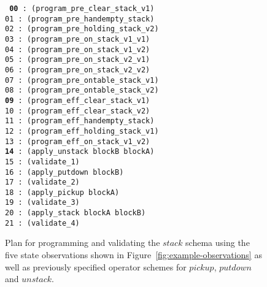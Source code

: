 \documentclass[3p,times]{elsarticle}
\begin{document}
\begin{figure}[hbt!]
{\footnotesize\tt
     {\bf 00} : (program\_pre\_clear\_stack\_v1)\\
     01 : (program\_pre\_handempty\_stack)\\
     02 : (program\_pre\_holding\_stack\_v2)\\
     03 : (program\_pre\_on\_stack\_v1\_v1)\\
     04 : (program\_pre\_on\_stack\_v1\_v2)\\
     05 : (program\_pre\_on\_stack\_v2\_v1)\\
     06 : (program\_pre\_on\_stack\_v2\_v2)\\
     07 : (program\_pre\_ontable\_stack\_v1)\\
     08 : (program\_pre\_ontable\_stack\_v2)\\
     {\bf 09} : (program\_eff\_clear\_stack\_v1)\\
    10 : (program\_eff\_clear\_stack\_v2)\\
    11 : (program\_eff\_handempty\_stack)\\
    12 : (program\_eff\_holding\_stack\_v1)\\
    13 : (program\_eff\_on\_stack\_v1\_v2)\\
    {\bf 14} : (apply\_unstack blockB blockA)\\
    15 : (validate\_1)\\
    16 : (apply\_putdown blockB)\\
    17 : (validate\_2)\\
    18 : (apply\_pickup blockA)\\
    19 : (validate\_3)\\
    20 : (apply\_stack blockA blockB)\\
    21 : (validate\_4)
}
 \caption{\small Plan for programming and validating the $stack$ schema using the five state observations shown in Figure~\ref{fig:example-observations} as well as previously specified operator schemes for $pickup$, $putdown$ and $unstack$.}
\label{fig:plan-observations}
\end{figure}
\end{document}
